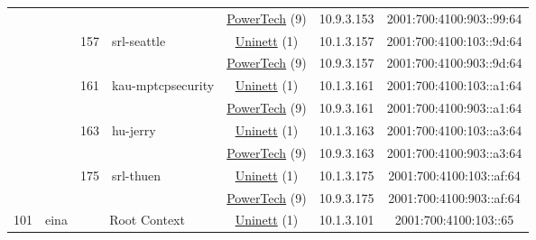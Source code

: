 \begin{small}
\begin{center}
\begin{longtable}{|c|c|c|c|c|c|c|c|}
  &  &  &  & \multicolumn{2}{|c|}{\tiny{\href{http://www.powertech.no}{PowerTech} (9)}} & \tiny{10.9.3.153} & \tiny{2001:700:4100:903::99:64} \\* \cline{3-3}\cline{4-4}\cline{5-5}\cline{6-6}\cline{7-7}\cline{8-8}
  &  & \multirow{2}{*}{\tiny{157}} & \multicolumn{1}{|l|}{\multirow{2}{*}{\tiny{srl-seattle}}} & \multicolumn{2}{|c|}{\tiny{\href{https://www.uninett.no}{Uninett} (1)}} & \tiny{10.1.3.157} & \tiny{2001:700:4100:103::9d:64} \\* \cline{5-5}\cline{6-6}\cline{7-7}\cline{8-8}
  &  &  &  & \multicolumn{2}{|c|}{\tiny{\href{http://www.powertech.no}{PowerTech} (9)}} & \tiny{10.9.3.157} & \tiny{2001:700:4100:903::9d:64} \\* \cline{3-3}\cline{4-4}\cline{5-5}\cline{6-6}\cline{7-7}\cline{8-8}
  &  & \multirow{2}{*}{\tiny{161}} & \multicolumn{1}{|l|}{\multirow{2}{*}{\tiny{kau-mptcpsecurity}}} & \multicolumn{2}{|c|}{\tiny{\href{https://www.uninett.no}{Uninett} (1)}} & \tiny{10.1.3.161} & \tiny{2001:700:4100:103::a1:64} \\* \cline{5-5}\cline{6-6}\cline{7-7}\cline{8-8}
  &  &  &  & \multicolumn{2}{|c|}{\tiny{\href{http://www.powertech.no}{PowerTech} (9)}} & \tiny{10.9.3.161} & \tiny{2001:700:4100:903::a1:64} \\* \cline{3-3}\cline{4-4}\cline{5-5}\cline{6-6}\cline{7-7}\cline{8-8}
  &  & \multirow{2}{*}{\tiny{163}} & \multicolumn{1}{|l|}{\multirow{2}{*}{\tiny{hu-jerry}}} & \multicolumn{2}{|c|}{\tiny{\href{https://www.uninett.no}{Uninett} (1)}} & \tiny{10.1.3.163} & \tiny{2001:700:4100:103::a3:64} \\* \cline{5-5}\cline{6-6}\cline{7-7}\cline{8-8}
  &  &  &  & \multicolumn{2}{|c|}{\tiny{\href{http://www.powertech.no}{PowerTech} (9)}} & \tiny{10.9.3.163} & \tiny{2001:700:4100:903::a3:64} \\* \cline{3-3}\cline{4-4}\cline{5-5}\cline{6-6}\cline{7-7}\cline{8-8}
  &  & \multirow{2}{*}{\tiny{175}} & \multicolumn{1}{|l|}{\multirow{2}{*}{\tiny{srl-thuen}}} & \multicolumn{2}{|c|}{\tiny{\href{https://www.uninett.no}{Uninett} (1)}} & \tiny{10.1.3.175} & \tiny{2001:700:4100:103::af:64} \\* \cline{5-5}\cline{6-6}\cline{7-7}\cline{8-8}
  &  &  &  & \multicolumn{2}{|c|}{\tiny{\href{http://www.powertech.no}{PowerTech} (9)}} & \tiny{10.9.3.175} & \tiny{2001:700:4100:903::af:64} \\ \hline
 \multirow{18}{*}{\tiny{101}} & \multicolumn{1}{|l|}{\multirow{18}{*}{\tiny{eina}}} & \multicolumn{2}{|c|}{\multirow{2}{*}{\tiny{Root Context}}} & \multicolumn{2}{|c|}{\tiny{\href{https://www.uninett.no}{Uninett} (1)}} & \tiny{10.1.3.101} & \tiny{2001:700:4100:103::65} \\* \cline{5-5}\cline{6-6}\cline{7-7}\cline{8-8}

\end{longtable}
\end{center}
\end{small}
